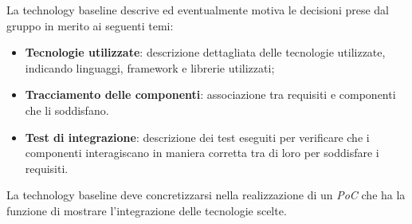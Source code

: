La technology baseline descrive ed eventualmente motiva le decisioni prese dal gruppo \Gruppo{} in merito ai seguenti temi:

\begin{itemize}
    \item \textbf{Tecnologie utilizzate}: descrizione dettagliata delle tecnologie utilizzate, indicando linguaggi,  framework e librerie utilizzati;
    \item \textbf{Tracciamento delle componenti}: associazione tra requisiti e componenti che li soddisfano.
    \item \textbf{Test di integrazione}: descrizione dei test eseguiti per verificare che i componenti interagiscano in maniera corretta tra di loro per soddisfare i requisiti.
\end{itemize}

La technology baseline deve concretizzarsi nella realizzazione di un \emph{PoC} che ha la funzione di mostrare l'integrazione delle tecnologie scelte.